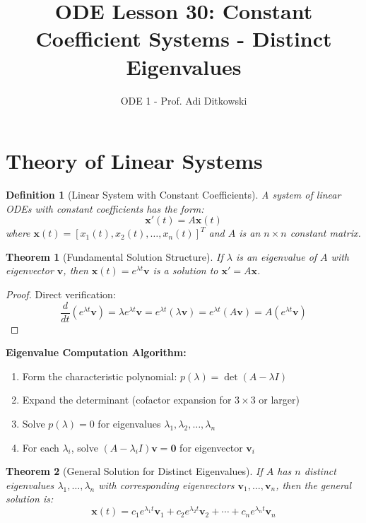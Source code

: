 \documentclass[12pt]{article}
\title{ODE Lesson 30: Constant Coefficient Systems - Distinct Eigenvalues}
\author{ODE 1 - Prof. Adi Ditkowski}
\date{}
\newtheorem{definition}{Definition}
\newtheorem{theorem}{Theorem}
\begin{document}
\maketitle

\section{Theory of Linear Systems}

\begin{definition}[Linear System with Constant Coefficients]
A system of linear ODEs with constant coefficients has the form:
\begin{equation}
\mathbf{x}'(t) = A\mathbf{x}(t)
\end{equation}
where $\mathbf{x}(t) = [x_{1}(t), x_{2}(t), \ldots, x_{n}(t)]^{T}$ and $A$ is an $n \times n$ constant matrix.
\end{definition}

\begin{theorem}[Fundamental Solution Structure]
If $\lambda$ is an eigenvalue of $A$ with eigenvector $\mathbf{v}$, then $\mathbf{x}(t) = e^{\lambda t}\mathbf{v}$ is a solution to $\mathbf{x}' = A\mathbf{x}$.
\end{theorem}

\begin{proof}
Direct verification:
\[\frac{d}{dt}(e^{\lambda t}\mathbf{v}) = \lambda e^{\lambda t}\mathbf{v} = e^{\lambda t}(\lambda \mathbf{v}) = e^{\lambda t}(A\mathbf{v}) = A(e^{\lambda t}\mathbf{v})\]
\end{proof}

\begin{eigenvalue}
\textbf{Eigenvalue Computation Algorithm:}
\begin{enumerate}
\item Form the characteristic polynomial: $p(\lambda) = \det(A - \lambda I)$
\item Expand the determinant (cofactor expansion for $3 \times 3$ or larger)
\item Solve $p(\lambda) = 0$ for eigenvalues $\lambda_{1}, \lambda_{2}, \ldots, \lambda_{n}$
\item For each $\lambda_{i}$, solve $(A - \lambda_{i} I)\mathbf{v} = \mathbf{0}$ for eigenvector $\mathbf{v}_{i}$
\end{enumerate}
\end{eigenvalue}

\begin{theorem}[General Solution for Distinct Eigenvalues]
If $A$ has $n$ distinct eigenvalues $\lambda_{1}, \ldots, \lambda_{n}$ with corresponding eigenvectors $\mathbf{v}_{1}, \ldots, \mathbf{v}_{n}$, then the general solution is:
\begin{equation}
\mathbf{x}(t) = c_{1} e^{\lambda_{1} t}\mathbf{v}_{1} + c_{2} e^{\lambda_{2} t}\mathbf{v}_{2} + \cdots + c_{n} e^{\lambda_{n} t}\mathbf{v}_{n}
\end{equation}
\end{theorem}
\end{document}
